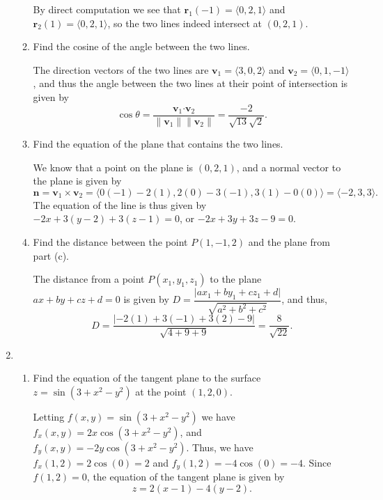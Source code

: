 \documentclass[12pt]{article}
\newcommand{\points}[1]{\marginpar{\hspace{24pt}[#1]}}
\newcommand{\vv}{\mathbf{v}}
\newcommand{\dotp}{\boldsymbol{\cdot}}
\newcommand{\len}[1]{\lVert #1\rVert}
\renewcommand{\r}{\mathbf{r}}
\begin{document}
\begin{enumerate}
\begin{enumerate}
\bigskip

By direct computation we see that $\r_1(-1) = \langle 0,2,1\rangle$ and $\r_2(1) = \langle 0,2,1\rangle$, so the two lines indeed intersect at $(0,2,1)$.

\bigskip

\bigskip


\item Find the cosine of the angle between the two lines. \points{3}

\bigskip

The direction vectors of the two lines are $\vv_1 = \langle 3,0,2\rangle$ and $\vv_2 = \langle 0,1,-1\rangle$, and thus the angle between the two lines at their point of intersection is given by
\[
 \cos\theta = \frac{\vv_1\dotp\vv_2}{\len{\vv_1}\len{\vv_2}} = \frac{-2}{\sqrt{13}\sqrt{2}}.
\]

\bigskip


\item Find the equation of the plane that contains the two lines. \points{4}

\bigskip

We know that a point on the plane is $(0,2,1)$, and a normal vector to the plane is given by
\[
 \mathbf{n} = \vv_1\times\vv_2 = \langle 0(-1)-2(1), 2(0)-3(-1), 3(1)-0(0)\rangle =\langle -2, 3, 3\rangle.
\]
The equation of the line is thus given by $-2x+3(y-2)+3(z-1)=0$, or $-2x+3y+3z-9=0$.

\bigskip


\item Find the distance between the point $P(1,-1,2)$ and the plane from part (c).\points{3}

\bigskip

The distance from a point $P(x_1,y_1,z_1)$ to the plane $ax+by+cz+d=0$ is given by $D=\dfrac{\lvert ax_1+by_1+cz_1+d\rvert}{\sqrt{a^2+b^2+c^2}}$, and thus,
\[
 D = \frac{\lvert -2(1)+3(-1)+3(2)-9\rvert}{\sqrt{4+9+9}} = \frac{8}{\sqrt{22}}.
\]

\end{enumerate}
\newpage


\item \begin{enumerate}
\item Find the equation of the tangent plane to the surface $z=\sin(3+x^2-y^2)$ at the point $(1,2,0)$. \points{5}

\bigskip

Letting $f(x,y) = \sin(3+x^2-y^2)$ we have $f_x(x,y) = 2x\cos(3+x^2-y^2)$, and $f_y(x,y) = -2y\cos(3+x^2-y^2)$. Thus, we have $f_x(1,2) = 2\cos(0)=2$ and $f_y(1,2) = -4\cos(0) = -4$. Since $f(1,2)=0$, the equation of the tangent plane is given by
\[
 z=  2(x-1)-4(y-2).
\]


\end{enumerate}
\end{enumerate}
\end{document}

